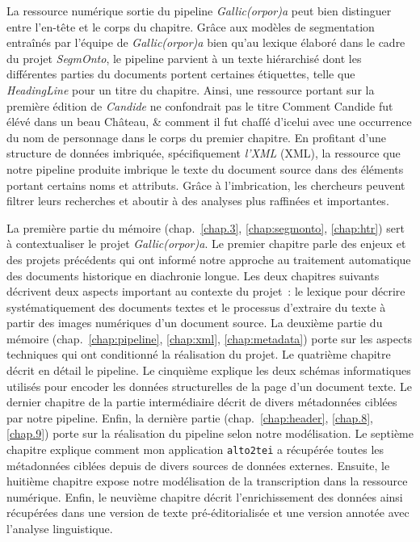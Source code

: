 \documentclass[class=article, crop=false]{standalone}
\begin{document}
La ressource numérique sortie du pipeline \textit{Gallic(orpor)a} peut bien distinguer entre l'en-tête et le corps du chapitre. Grâce aux modèles de segmentation entraînés par l'équipe de \textit{Gallic(orpor)a} bien qu'au lexique élaboré dans le cadre du projet \textit{SegmOnto}, le pipeline parvient à un texte hiérarchisé dont les différentes parties du documents portent certaines étiquettes, telle que \textit{HeadingLine} pour un titre du chapitre. Ainsi, une ressource portant sur la première édition de \textit{Candide} ne confondrait pas le titre \og{}Comment Candide fut élévé dans un beau Château, \& comment il fut chaſſé d'icelui\fg{} avec une occurrence du nom de personnage dans le corps du premier chapitre. En profitant d'une structure de données imbriquée, spécifiquement \textit{l'\acrlong{XML}} (\acrshort{XML}), la ressource que notre pipeline produite imbrique le texte du document source dans des éléments portant certains noms et attributs. Grâce à l'imbrication, les chercheurs peuvent filtrer leurs recherches et aboutir à des analyses plus raffinées et importantes.

La première partie du mémoire (chap.~\ref{chap.3}, \ref{chap:segmonto}, \ref{chap:htr}) sert à contextualiser le projet \textit{Gallic(orpor)a}. Le premier chapitre parle des enjeux et des projets précédents qui ont informé notre approche au traitement automatique des documents historique en diachronie longue. Les deux chapitres suivants décrivent deux aspects important au contexte du projet~: le lexique pour décrire systématiquement des documents textes et le processus d'extraire du texte à partir des images numériques d'un document source. La deuxième partie du mémoire (chap.~\ref{chap:pipeline}, \ref{chap:xml}, \ref{chap:metadata}) porte sur les aspects techniques qui ont conditionné la réalisation du projet. Le quatrième chapitre décrit en détail le pipeline. Le cinquième explique les deux schémas informatiques utilisés pour encoder les données structurelles de la page d'un document texte. Le dernier chapitre de la partie intermédiaire décrit de divers métadonnées ciblées par notre pipeline. Enfin, la dernière partie (chap.~\ref{chap:header}, \ref{chap.8}, \ref{chap.9}) porte sur la réalisation du pipeline selon notre modélisation. Le septième chapitre explique comment mon application \texttt{alto2tei} a récupérée toutes les métadonnées ciblées depuis de divers sources de données externes. Ensuite, le huitième chapitre expose notre modélisation de la transcription dans la ressource numérique. Enfin, le neuvième chapitre décrit l'enrichissement des données ainsi récupérées dans une version de texte pré-éditorialisée et une version annotée avec l'analyse linguistique.
\end{document}
